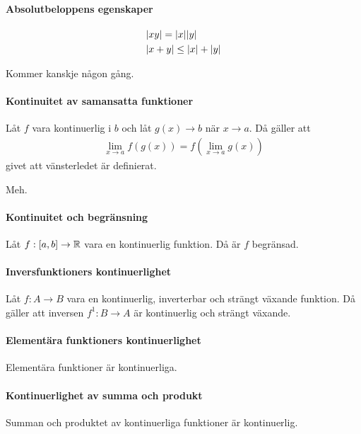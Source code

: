 \paragraph{Absolutbeloppens egenskaper}

\begin{align}
	&\abs{xy} = \abs{x}\abs{y} \label{eq:abs_prod} \\
	&\abs{x + y} \leq \abs{x} + \abs{y} \label{eq:abs_sum}
\end{align}

\proof

Kommer kanskje någon gång.

\paragraph{Kontinuitet av samansatta funktioner}
Låt $f$ vara kontinuerlig i $b$ och låt $g(x)\to b$ när $x\to a$. Då gäller att
\begin{align*}
	\lim\limits_{x\to a}f(g(x)) = f(\lim\limits_{x\to a}g(x))
\end{align*}
givet att vänsterledet är definierat.

\proof
Meh.

\paragraph{Kontinuitet och begränsning}\label{par:continuity_limited}
Låt $f: [a,b]\to\mathbb{R}$ vara en kontinuerlig funktion. Då är $f$ begränsad.

\proof

\paragraph{Inversfunktioners kontinuerlighet}
Låt $f: A\to B$ vara en kontinuerlig, inverterbar och strängt växande funktion. Då gäller att inversen $f^{1}: B\to A$ är kontinuerlig och strängt växande.

\proof

\paragraph{Elementära funktioners kontinuerlighet}
Elementära funktioner är kontinuerliga.

\proof

\paragraph{Kontinuerlighet av summa och produkt}
Summan och produktet av kontinuerliga funktioner är kontinuerlig.


